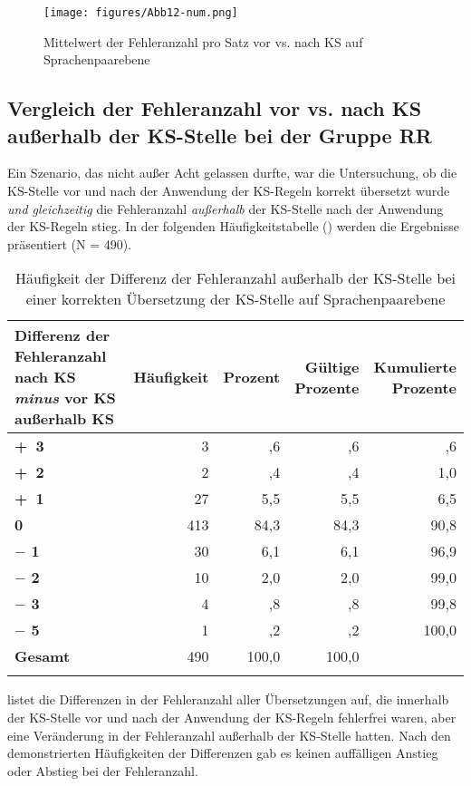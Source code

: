 \begin{figure}
{\itshape}
\texttt{[image: figures/Abb12-num.png]}
\caption{\label{fig:05:12}Mittelwert der Fehleranzahl pro Satz vor vs. nach KS auf Sprachenpaarebene}
\end{figure}

\subsection{Vergleich der Fehleranzahl vor vs. nach KS außerhalb der KS-Stelle bei der Gruppe RR}
\label{sec:5.2.2}
Ein Szenario, das nicht außer Acht gelassen durfte, war die Untersuchung, ob die KS-Stelle vor und nach der Anwendung der KS-Regeln korrekt übersetzt wurde \textit{und gleichzeitig} die Fehleranzahl \textit{außerhalb} der KS-Stelle nach der Anwendung der KS-Regeln stieg. In der folgenden Häufigkeitstabelle () werden die Ergebnisse präsentiert (N = 490).


\begin{table}
\begin{tabularx}{\textwidth}{Xrrrr}
\lsptoprule
\textbf{Differenz der Fehleranzahl}
\textbf{nach KS \textit{minus}} \textbf{vor KS außerhalb KS} & Häufigkeit & Prozent & \makecell[rt]{Gültige\\Prozente} & \makecell[rt]{Kumulierte\\Prozente}\\
\midrule
 \textbf{+~3} & 3 & ,6 & ,6 & ,6\\
 \textbf{+~2} & 2 & ,4 & ,4 & 1,0\\
 \textbf{+~1} & 27 & 5,5 & 5,5 & 6,5\\
 \textbf{0} & 413 & 84,3 & 84,3 & 90,8\\
 \textbf{$-$ 1} & 30 & 6,1 & 6,1 & 96,9\\
 \textbf{$-$ 2} & 10 & 2,0 & 2,0 & 99,0\\
 \textbf{$-$ 3} & 4 & ,8 & ,8 & 99,8\\
 \textbf{$-$ 5} & 1 & ,2 & ,2 & 100,0\\
 \midrule
 \textbf{Gesamt} & 490 & 100,0 & 100,0 & \\
\lspbottomrule
\end{tabularx}
\caption{\label{tab:05:17}   Häufigkeit der Differenz der Fehleranzahl außerhalb der KS-Stelle bei einer korrekten Übersetzung der KS-Stelle auf Sprachenpaarebene}
\end{table}

 listet die Differenzen in der Fehleranzahl aller Übersetzungen auf, die innerhalb der KS-Stelle vor und nach der Anwendung der KS-Regeln fehlerfrei waren, aber eine Veränderung in der Fehleranzahl außerhalb der KS-Stelle hatten. Nach den demonstrierten Häufigkeiten der Differenzen gab es keinen auffälligen Anstieg oder Abstieg bei der Fehleranzahl.

